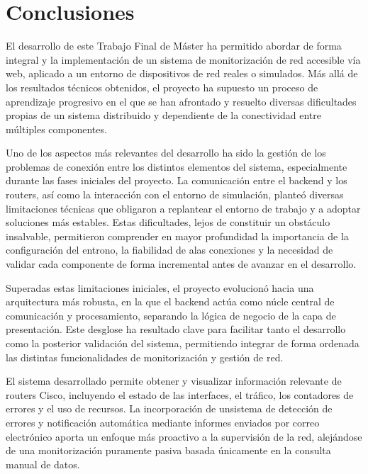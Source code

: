 
\chapter{Conclusiones}
\label{conclusiones}

El desarrollo de este Trabajo Final de Máster ha permitido abordar de forma integral y la implementación de un sistema de monitorización de red accesible vía web, aplicado a un entorno de dispositivos de red reales o simulados. Más allá de los resultados técnicos obtenidos, el proyecto ha supuesto un proceso de aprendizaje progresivo en el que se han afrontado y resuelto diversas dificultades propias de un sistema distribuido y dependiente de la conectividad entre múltiples componentes.

Uno de los aspectos más relevantes del desarrollo ha sido la gestión de los problemas de conexión entre los distintos elementos del sistema, especialmente durante las fases iniciales del proyecto. La comunicación entre el backend y los routers, así como la interacción con el entorno de simulación, planteó diversas limitaciones técnicas que obligaron a replantear el entorno de trabajo y a adoptar soluciones más estables. Estas dificultades, lejos de constituir un obstáculo insalvable, permitieron comprender en mayor profundidad la importancia de la configuración del entrono, la fiabilidad de alas conexiones y la necesidad de validar cada componente de forma incremental antes de avanzar en el desarrollo.

Superadas estas limitaciones iniciales, el proyecto evolucionó hacia una arquitectura más robusta, en la que el backend actúa como núcle central de comunicación y procesamiento, separando la lógica de negocio de la capa de presentación. Este desglose ha resultado clave para facilitar tanto el desarrollo como la posterior validación del sistema, permitiendo integrar de forma ordenada las distintas funcionalidades de monitorización y gestión de red.

El sistema desarrollado permite obtener y visualizar información relevante de routers Cisco, incluyendo el estado de las interfaces, el tráfico, los contadores de errores y el uso de recursos. La incorporación de unsistema de detección de errores y notificación automática mediante informes enviados por correo electrónico aporta un enfoque más proactivo a la supervisión de la red, alejándose de una monitorización puramente pasiva basada únicamente en la consulta manual de datos.

